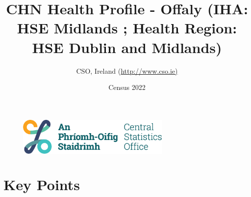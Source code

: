 \documentclass{article}
\title{CHN Health Profile - Offaly (IHA: HSE Midlands ;  Health Region: HSE Dublin and Midlands) }
\date{Census 2022}
\author{CSO, Ireland  (\url{http://www.cso.ie)}}
\begin{document}


\begin{figure}
	\centering
\includegraphics[width =75mm]{../figures/CSO_Logo.png}
\end{figure}

				 
		   
						  
														  
																																													
												 
			 
\maketitle
					
													   
				 
						 
																																																																											   
				 
				  
  \pagebreak
    	    \tableofcontents

\pagebreak


\section{Key Points}
\end{document}

